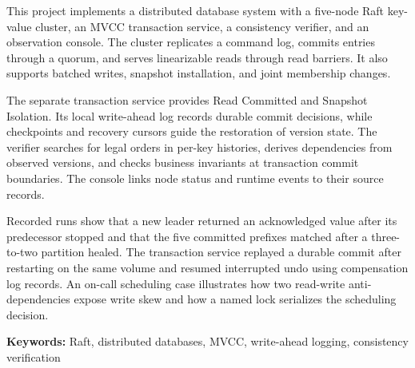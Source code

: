 \thispagestyle{empty}
This project implements a distributed database system with a five-node Raft key-value cluster, an MVCC transaction service, a consistency verifier, and an observation console. The cluster replicates a command log, commits entries through a quorum, and serves linearizable reads through read barriers. It also supports batched writes, snapshot installation, and joint membership changes.

The separate transaction service provides Read Committed and Snapshot Isolation. Its local write-ahead log records durable commit decisions, while checkpoints and recovery cursors guide the restoration of version state. The verifier searches for legal orders in per-key histories, derives dependencies from observed versions, and checks business invariants at transaction commit boundaries. The console links node status and runtime events to their source records.

Recorded runs show that a new leader returned an acknowledged value after its predecessor stopped and that the five committed prefixes matched after a three-to-two partition healed. The transaction service replayed a durable commit after restarting on the same volume and resumed interrupted undo using compensation log records. An on-call scheduling case illustrates how two read-write anti-dependencies expose write skew and how a named lock serializes the scheduling decision.

\vspace{0.8cm}
\noindent\textbf{Keywords:} Raft, distributed databases, MVCC, write-ahead logging, consistency verification

